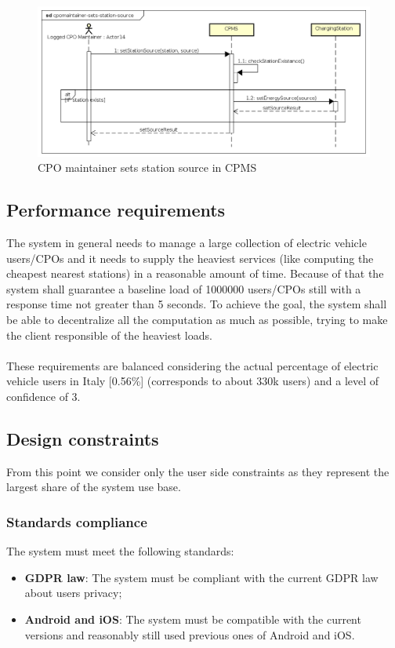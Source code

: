 \begin{figure}[!h]
    \begin{center}
        \includegraphics[keepaspectratio, width=16cm]{Sequence/cpomaintainer-sets-station-source.png}
        \caption{\ac{CPO} maintainer sets station source in \ac{CPMS}}
    \end{center}
\end{figure}

\clearpage
\subsection{Performance requirements}
The system in general needs to manage a large collection of electric vehicle users/\acp{CPO} and it needs to supply the heaviest services (like computing the cheapest nearest stations) in a reasonable amount of time.
Because of that the system shall guarantee a baseline load of 1000000 users/\acp{CPO} still with a response time not greater than 5 seconds. To achieve the goal, the system shall be able to decentralize all the computation as much as possible,
trying to make the client responsible of the heaviest loads.\\\\
These requirements are balanced considering the actual percentage of electric vehicle users in Italy [0.56\%] (corresponds to about 330k users) and a level of confidence of 3.
\subsection{Design constraints}
From this point we consider only the user side constraints as they represent the largest share of the system use base.
\subsubsection{Standards compliance}
The system must meet the following standards:
\begin{itemize}
    \item \textbf{\ac{GDPR} law}: The system must be compliant with the current \ac{GDPR} law about users privacy;
    \item \textbf{Android and iOS}: The system must be compatible with the current versions and reasonably still used previous ones of Android and iOS.
\end{itemize}
